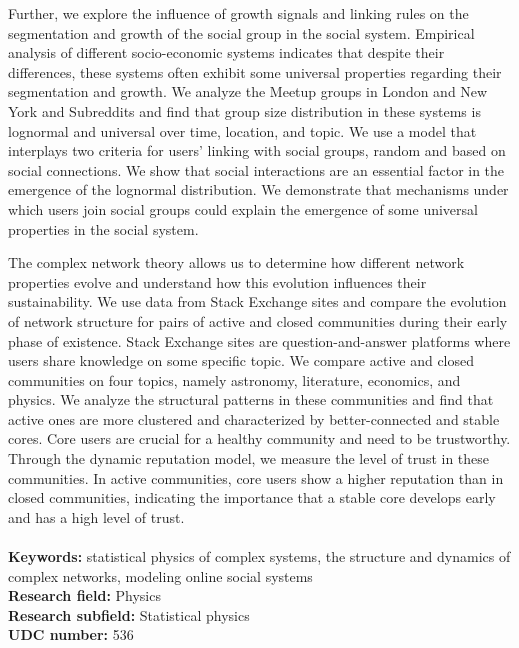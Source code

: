 Further, we explore the influence of growth signals and linking rules on the segmentation and growth of the social group in the social system. Empirical analysis of different socio-economic systems indicates that despite their differences, these systems often exhibit some universal properties regarding their segmentation and growth. We analyze the Meetup groups in London and New York and Subreddits and find that group size distribution in these systems is lognormal and universal over time, location, and topic. We use a model that interplays two criteria for users’ linking with social groups, random and based on social connections. We show that social interactions are an essential factor in the emergence of the lognormal distribution. We demonstrate that mechanisms under which users join social groups could explain the emergence of some universal properties in the social system.

The complex network theory allows us to determine how different network properties evolve and understand how this evolution influences their sustainability. We use data from Stack Exchange sites and compare the evolution of network structure for pairs of active and closed communities during their early phase of existence. Stack Exchange sites are question-and-answer platforms where users share knowledge on some specific topic. We compare active and closed communities on four topics, namely astronomy, literature, economics, and physics. We analyze the structural patterns in these communities and find that active ones are more clustered and characterized by better-connected and stable cores. Core users are crucial for a healthy community and need to be trustworthy. Through the dynamic reputation model, we measure the level of trust in these communities. In active communities, core users show a higher reputation than in closed communities, indicating the importance that a stable core develops early and has a high level of trust. \\~\\
{\textbf {Keywords:}} statistical physics of complex systems,  the structure and dynamics of complex networks, modeling online social systems \\
{\textbf {Research field:}} Physics \\
{\textbf {Research subfield:}} Statistical physics\\
\textbf{UDC number:} 536 %

\hfill
\justify
